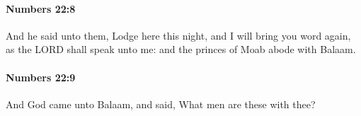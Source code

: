		\paragraph{Numbers 22:8} %
			\label{NUMBERS-22-8}

			And he said unto them, Lodge here this night, and I will bring you word again, as the LORD shall speak unto me: and the princes of Moab abode with Balaam.


		\paragraph{Numbers 22:9} %
			\label{NUMBERS-22-9}

			And God came unto Balaam, and said, What men are these with thee?



